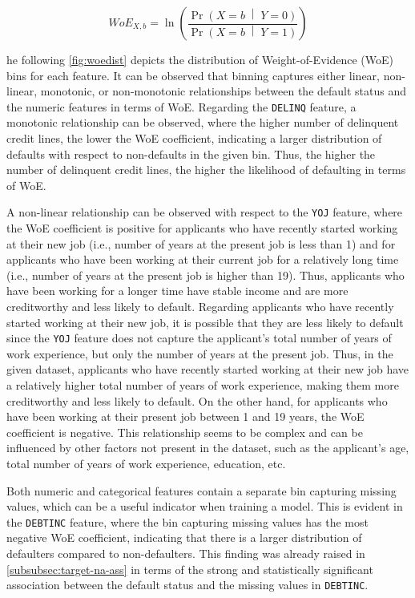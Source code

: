 \begin{equation}\label{eq}
	WoE_{X, b}= \ln \left(\frac{\Pr{\left(X = b\;\middle|\;Y = 0\right)}}{\Pr{\left(X = b\;\middle|\;Y = 1\right)}}\right)
\end{equation}

he following \autoref{fig:woedist} depicts the distribution of Weight-of-Evidence (WoE) bins for each feature. It can be observed that binning captures either linear, non-linear, monotonic, or non-monotonic relationships between the default status and the numeric features in terms of WoE.
 Regarding the \texttt{DELINQ} feature, a monotonic relationship can be observed, where the higher number of delinquent credit lines, the lower the WoE coefficient, indicating a larger distribution of defaults with respect to non-defaults in the given bin.
 Thus, the higher the number of delinquent credit lines, the higher the likelihood of defaulting in terms of WoE.

 A non-linear relationship can be observed with respect to the \texttt{YOJ} feature, where the WoE coefficient is positive for applicants who have recently started working at their new job (i.e., number of years at the present job is less than 1) and for applicants who have been working at their current job for a relatively long time (i.e., number of years at the present job is higher than 19).
 Thus, applicants who have been working for a longer time have stable income and are more creditworthy and less likely to default.
 Regarding applicants who have recently started working at their new job, it is possible that they are less likely to default since the \texttt{YOJ} feature does not capture the applicant's total number of years of work experience, but only the number of years at the present job.
 Thus, in the given dataset, applicants who have recently started working at their new job have a relatively higher total number of years of work experience, making them more creditworthy and less likely to default. On the other hand, for applicants who have been working at their present job between 1 and 19 years, the WoE coefficient is negative.
 This relationship seems to be complex and can be influenced by other factors not present in the dataset, such as the applicant's age, total number of years of work experience, education, etc.

 Both numeric and categorical features contain a separate bin capturing missing values, which can be a useful indicator when training a model. This is evident in the \texttt{DEBTINC} feature, where the bin capturing missing values has the most negative WoE coefficient, indicating that there is a larger distribution of defaulters compared to non-defaulters.
 This finding was already raised in \autoref{subsubsec:target-na-ass} in terms of the strong and statistically significant association between the default status and the missing values in \texttt{DEBTINC}.

